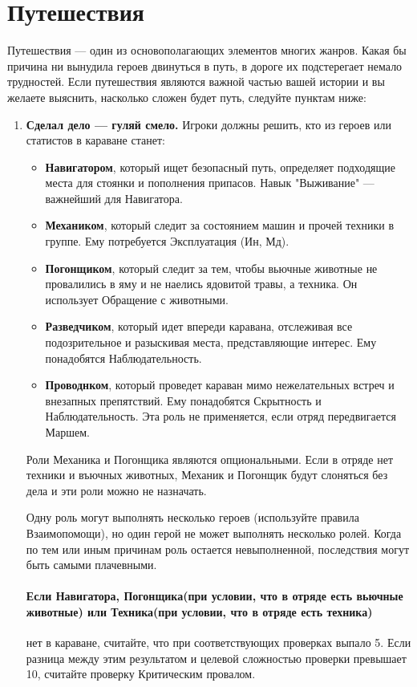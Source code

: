 \section{Путешествия}
Путешествия — один из основополагающих элементов многих жанров. Какая бы причина ни вынудила героев двинуться в путь, в дороге их подстерегает немало трудностей. Если путешествия являются важной частью вашей истории и вы желаете выяснить, насколько сложен будет путь, следуйте пунктам ниже:
\begin{enumerate}
\item \textbf{Сделал дело — гуляй смело.} Игроки должны решить, кто из героев или статистов в караване станет:
\begin{itemize}
\item \textbf{Навигатором}, который ищет безопасный путь, определяет подходящие места для стоянки и пополнения припасов. Навык "Выживание" — важнейший для Навигатора.
\item \textbf{Механиком}, который следит за состоянием машин и прочей техники в группе. Ему потребуется Эксплуатация (Ин, Мд).
\item \textbf{Погонщиком}, который следит за тем, чтобы вьючные животные не провалились в яму и не наелись ядовитой травы, а техника. Он использует Обращение с животными.
\item \textbf{Разведчиком}, который идет впереди каравана, отслеживая все подозрительное и разыскивая места, представляющие интерес. Ему понадобятся Наблюдательность.
\item \textbf{Проводнком}, который проведет караван мимо нежелательных встреч и внезапных препятствий. Ему понадобятся Скрытность и Наблюдательность. Эта роль не применяется, если отряд передвигается Маршем. 
\end{itemize}
\begin{tcolorbox}
Роли Механика и Погонщика являются опциональными. Если в отряде нет техники и въючных животных, Механик и Погонщик будут слоняться без дела и эти роли можно не назначать.
\end{tcolorbox}
Одну роль могут выполнять несколько героев (используйте правила Взаимопомощи), но один герой не может выполнять несколько ролей.
\newline
Когда по тем или иным причинам роль остается невыполненной, последствия могут быть самыми плачевными.
\paragraph{Если Навигатора, Погонщика(при условии, что в отряде есть вьючные животные) или Техника(при условии, что в отряде есть техника)} нет в караване, считайте, что при соответствующих проверках выпало 5. Если разница между этим результатом и целевой сложностью проверки превышает 10, считайте проверку Критическим провалом.

\end{enumerate}

